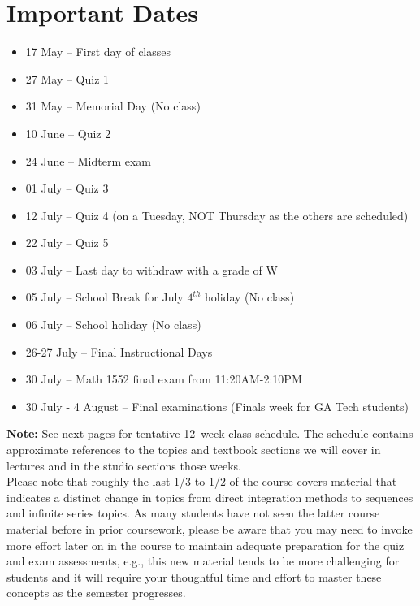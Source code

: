 \documentclass[11pt]{article}
\begin{document}
\section{Important Dates}
\begin{multicols}{2}
\begin{itemize}
    \item 17 May -- First day of classes
    \item 27 May -- Quiz 1
    \item 31 May -- Memorial Day (No class)
    \item 10 June -- Quiz 2
    \item 24 June -- Midterm exam
    \item 01 July -- Quiz 3
    \item 12 July -- Quiz 4 (on a Tuesday, NOT Thursday as the others are scheduled)
    \item 22 July -- Quiz 5
    \item 03 July -- Last day to withdraw with a grade of W
    \item 05 July -- School Break for July $4^{th}$ holiday (No class)
    \item 06 July -- School holiday (No class)
    \item 26-27 July -- Final Instructional Days
    \item 30 July -- Math 1552 final exam from 11:20AM-2:10PM
    \item 30 July - 4 August -- Final examinations (Finals week for GA Tech students)
\end{itemize}
\end{multicols}

\vspace{1cm}
{\bf Note:} See next pages for tentative 12--week class schedule. 
The schedule contains approximate references to the topics and textbook sections 
we will cover in lectures and in the studio sections those weeks. \\ 
Please note that roughly the last 1/3 to 1/2 of the course covers material that 
indicates a distinct change in topics from direct integration methods to 
sequences and infinite series topics. As many students have not seen the latter course 
material before in prior coursework, please be aware that you may need to invoke more 
effort later on in the course to maintain adequate preparation for the quiz and exam 
assessments, e.g., this new material tends to be more challenging for students and it will 
require your thoughtful time and effort to master these concepts as the semester progresses. 
\end{document}
